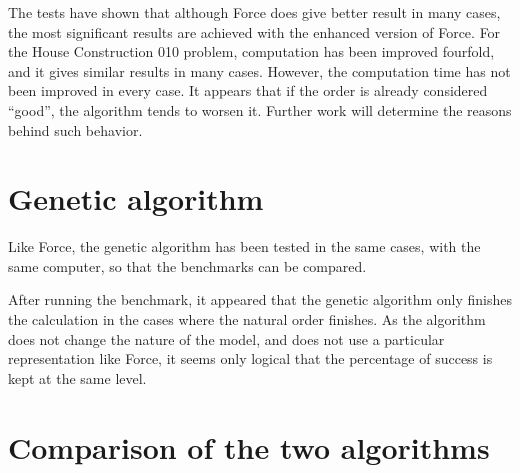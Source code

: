 \documentclass[12pt]{report}
\begin{document}
The tests have shown that although Force does give better result in many cases, the most significant results are achieved with the enhanced version of Force. For the House Construction 010 problem, computation has been improved fourfold, and it gives similar results in many cases. However, the computation time has not been improved in every case. It appears that if the order is already considered \enquote{good}, the algorithm tends to worsen it. Further work will determine the reasons behind such behavior.

\section{Genetic algorithm}

Like Force, the genetic algorithm has been tested in the same cases, with the same computer, so that the benchmarks can be compared.

\begin{table}[!h]
  \begin{center}
    \label{genetic_results}
    \caption{Genetic algorithm results, compared to the natural order (in percentages)}
    \hspace*{-0.52cm}
  \end{center}
\end{table}

After running the benchmark, it appeared that the genetic algorithm only finishes the calculation in the cases where the natural order finishes. As the algorithm does not change the nature of the model, and does not use a particular representation like Force, it seems only logical that the percentage of success is kept at the same level.



\section{Comparison of the two algorithms}
\end{document}

